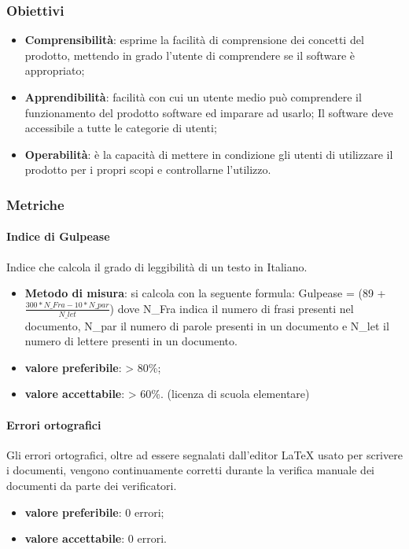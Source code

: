 \subsubsection{Obiettivi}
\begin{itemize}
\item \textbf{Comprensibilità}: esprime la facilità di comprensione dei concetti del prodotto, mettendo in grado l'utente di comprendere se il software è appropriato;
\item \textbf{Apprendibilità}: facilità con cui un utente medio può comprendere il funzionamento del prodotto software ed imparare ad usarlo; Il software deve accessibile a tutte le categorie di utenti;
\item \textbf{Operabilità}: è la capacità di mettere in condizione gli utenti di utilizzare il prodotto per i propri scopi e controllarne l'utilizzo.
\end{itemize}

\subsubsection{Metriche}

\paragraph{Indice di Gulpease}
Indice che calcola il grado di leggibilità di un testo in Italiano.
\begin{itemize}
\item \textbf{Metodo di misura}: si calcola con la seguente formula:
Gulpease = (89 + $\frac{300*N\_Fra - 10*N\_par}{N\_let}$) 
dove N\_Fra indica il numero di frasi presenti nel documento, N\_par il numero di parole presenti in un documento e N\_let il numero di lettere presenti in un documento.
\item \textbf{valore preferibile}: > 80\%;
\item \textbf{valore accettabile}: > 60\%. (licenza di scuola elementare)
\end{itemize}

\paragraph{Errori ortografici}
Gli errori ortografici, oltre ad essere segnalati dall'editor \LaTeX{} usato per scrivere i documenti, vengono continuamente corretti durante la verifica manuale dei documenti da parte dei verificatori.
\begin{itemize}
\item \textbf{valore preferibile}: 0 errori;
\item \textbf{valore accettabile}: 0 errori.
\end{itemize}

